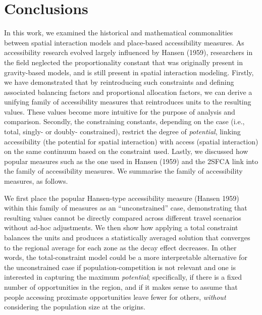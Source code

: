 \documentclass[
]{article}
\begin{document}
\section{Conclusions}\label{conclusions}

In this work, we examined the historical and mathematical commonalities
between spatial interaction models and place-based accessibility
measures. As accessibility research evolved largely influenced by Hansen
(1959), researchers in the field neglected the proportionality constant
that was originally present in gravity-based models, and is still
present in spatial interaction modeling. Firstly, we have demonstrated
that by reintroducing such constraints and defining associated balancing
factors and proportional allocation factors, we can derive a unifying
family of accessibility measures that reintroduces units to the
resulting values. These values become more intuitive for the purpose of
analysis and comparison. Secondly, the constraining constants, depending
on the case (i.e., total, singly- or doubly- constrained), restrict the
degree of \emph{potential}, linking accessibility (the potential for
spatial interaction) with access (spatial interaction) on the same
continuum based on the constraint used. Lastly, we discussed how popular
measures such as the one used in Hansen (1959) and the 2SFCA link into
the family of accessibility measures. We summarise the family of
accessibility measures, as follows.

We first place the popular Hansen-type accessibility measure (Hansen
1959) within this family of measures as an ``unconstrained'' case,
demonstrating that resulting values cannot be directly compared across
different travel scenarios without ad-hoc adjustments. We then show how
applying a total constraint balances the units and produces a
statistically averaged solution that converges to the regional average
for each zone as the decay effect decreases. In other words, the
total-constraint model could be a more interpretable alternative for the
unconstrained case if population-competition is not relevant and one is
interested in capturing the maximum \emph{potential}; specifically, if
there is a fixed number of opportunities in the region, and if it makes
sense to assume that people accessing proximate opportunities leave
fewer for others, \emph{without} considering the population size at the
origins.
\end{document}
